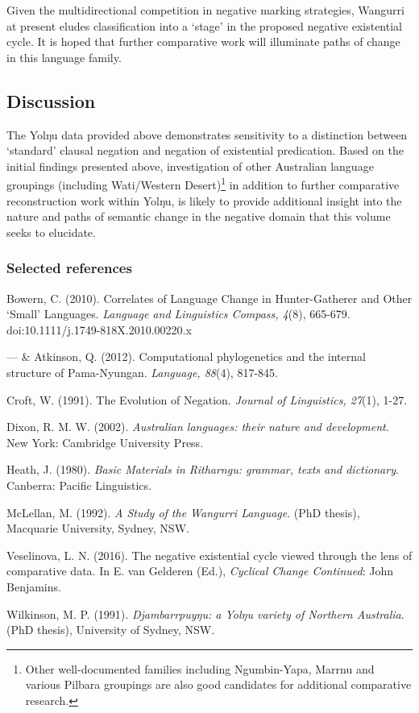 \documentclass[10.5pt]{article}
\begin{document}
Given the multidirectional competition in negative marking strategies, Wangurri at present eludes classification into a `stage' in the proposed negative existential cycle. It is hoped that further comparative work will illuminate paths of change in this language family.
\subsection*{Discussion}
The Yolŋu data provided above demonstrates sensitivity to a distinction between `standard' clausal negation and negation of existential predication. Based on the initial findings presented above, investigation of other Australian language groupings (including Wati/Western Desert)\footnote{Other well-documented families including Ngumbin-Yapa, Marrnu and various Pilbara groupings are also good candidates for additional comparative research.} in addition to further comparative reconstruction work within Yolŋu, is likely to provide additional insight into the nature and paths of semantic change in the negative domain that this volume seeks to elucidate.


\vfill\subsubsection*{Selected references}
\small\begin{hangparas}{3em}{1}

Bowern, C. (2010). Correlates of Language Change in Hunter-Gatherer and Other ‘Small’ Languages. \textit{Language and Linguistics Compass, 4}(8), 665-679. doi:10.1111/j.1749-818X.2010.00220.x

--- \& Atkinson, Q. (2012). Computational phylogenetics and the internal structure of Pama-Nyungan. \textit{Language, 88}(4), 817-845. 

Croft, W. (1991). The Evolution of Negation. \textit{Journal of Linguistics, 27}(1), 1-27.

Dixon, R. M. W. (2002).\textit{ Australian languages: their nature and development}. New York: Cambridge University Press.
 
 
Heath, J. (1980). \textit{Basic Materials in Ritharngu: grammar, texts and dictionary}. Canberra: Pacific Linguistics.
 
 
 
McLellan, M. (1992).\textit{ A Study of the Wangurri Language}. (PhD thesis), Macquarie University, Sydney, NSW.   



Veselinova, L. N. (2016). The negative existential cycle viewed through the lens of comparative data. In E. van Gelderen (Ed.),\textit{ Cyclical Change Continued}: John Benjamins.

Wilkinson, M. P. (1991). \textit{Djambarrpuyŋu: a Yolŋu variety of Northern Australia}. (PhD thesis), University of Sydney, NSW.   



\end{hangparas}
\end{document}
